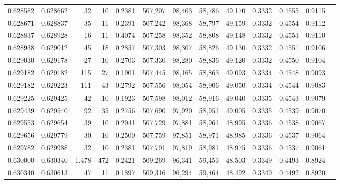 \begin{tabular}{rrrrrrrrrrrrr}
0.628582 & 0.628662 &    32 &  10 &                                     0.2381 & 507,207 &  98,403 &  58,786 &  49,170 & 0.3332 & 0.4555 & 0.9115 \\
0.628671 & 0.628837 &    35 &  11 &                                     0.2391 & 507,242 &  98,368 &  58,797 &  49,159 & 0.3332 & 0.4554 & 0.9112 \\
0.628837 & 0.628928 &    16 &  11 &                                     0.4074 & 507,258 &  98,352 &  58,808 &  49,148 & 0.3332 & 0.4553 & 0.9110 \\
0.628938 & 0.629012 &    45 &  18 &                                     0.2857 & 507,303 &  98,307 &  58,826 &  49,130 & 0.3332 & 0.4551 & 0.9106 \\
0.629030 & 0.629178 &    27 &  10 &                                     0.2703 & 507,330 &  98,280 &  58,836 &  49,120 & 0.3332 & 0.4550 & 0.9104 \\
0.629182 & 0.629182 &   115 &  27 &                                     0.1901 & 507,445 &  98,165 &  58,863 &  49,093 & 0.3334 & 0.4548 & 0.9093 \\
0.629182 & 0.629223 &   111 &  43 &                                     0.2792 & 507,556 &  98,054 &  58,906 &  49,050 & 0.3334 & 0.4544 & 0.9083 \\
0.629225 & 0.629425 &    42 &  10 &                                     0.1923 & 507,598 &  98,012 &  58,916 &  49,040 & 0.3335 & 0.4543 & 0.9079 \\
0.629439 & 0.629540 &    92 &  35 &                                     0.2756 & 507,690 &  97,920 &  58,951 &  49,005 & 0.3335 & 0.4539 & 0.9070 \\
0.629553 & 0.629654 &    39 &  10 &                                     0.2041 & 507,729 &  97,881 &  58,961 &  48,995 & 0.3336 & 0.4538 & 0.9067 \\
0.629656 & 0.629779 &    30 &  10 &                                     0.2500 & 507,759 &  97,851 &  58,971 &  48,985 & 0.3336 & 0.4537 & 0.9064 \\
0.629782 & 0.629988 &    32 &  10 &                                     0.2381 & 507,791 &  97,819 &  58,981 &  48,975 & 0.3336 & 0.4537 & 0.9061 \\
0.630000 & 0.630340 & 1,478 & 472 &                                     0.2421 & 509,269 &  96,341 &  59,453 &  48,503 & 0.3349 & 0.4493 & 0.8924 \\
0.630340 & 0.630613 &    47 &  11 &                                     0.1897 & 509,316 &  96,294 &  59,464 &  48,492 & 0.3349 & 0.4492 & 0.8920 \\

\end{tabular}

